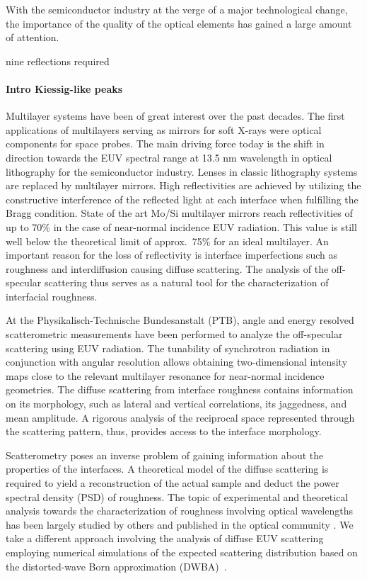 With the semiconductor industry at the verge of a major technological change, the importance of the quality of the optical elements has gained a large amount of attention.

nine reflections required \cite{kaiser_euvl_2008}

\paragraph{Intro Kiessig-like peaks}
Multilayer systems have been of great interest over the past decades. The first applications of multilayers serving as mirrors for soft X-rays were optical components for space probes. The main driving force today is the shift in direction towards the EUV spectral range at 13.5 nm wavelength in optical lithography for the semiconductor industry. Lenses in classic lithography systems are replaced by multilayer mirrors. High  reflectivities are achieved by utilizing the constructive interference of the reflected light at each interface when fulfilling the Bragg condition. State of the art Mo/Si multilayer mirrors reach reflectivities of up to 70\% \cite{braun_mo/si_2002, feigl_euv_2006} in the case of near-normal incidence EUV radiation. This value is still well below the theoretical limit of approx.~75\% for an ideal multilayer. An important reason for the loss of reflectivity is interface imperfections such as roughness and interdiffusion causing diffuse scattering. The analysis of the off-
specular scattering 
thus serves as a 
natural tool for the characterization of interfacial roughness. 

At the Physikalisch-Technische Bundesanstalt (PTB), angle and energy resolved scatterometric measurements have been performed to analyze the off-specular scattering using EUV radiation. The tunability of synchrotron radiation in conjunction with angular resolution allows obtaining two-dimensional intensity maps close to the relevant multilayer resonance for near-normal incidence geometries. The diffuse scattering from interface roughness contains information on its morphology, such as lateral and vertical correlations, its jaggedness, and mean amplitude. A rigorous analysis of the reciprocal space represented through the scattering pattern, thus, provides access to the interface morphology.

Scatterometry poses an inverse problem of gaining information about the properties of the interfaces. A theoretical model of the diffuse scattering is required to yield a reconstruction of the actual sample and deduct the power spectral density (PSD) of roughness. The topic of experimental and theoretical analysis towards the characterization of roughness involving optical wavelengths has been largely studied by others and published in the optical community \cite{amra_light_1993, amra_light_1994, elson_light_1980, elson_relationship_1983, schroder_angle-resolved_2011, schroder_spectral_2014}. We take a different approach involving the analysis of diffuse EUV scattering employing numerical simulations of the expected scattering distribution based on the distorted-wave Born approximation (DWBA)~\cite{holy_nonspecular_1994, holy_x-ray_1993}.

